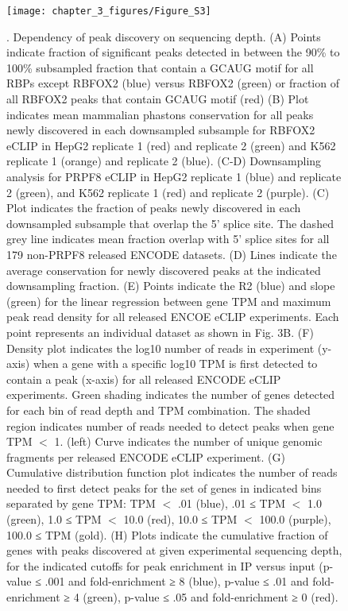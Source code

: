 \begin{figure}[ht]
  \centering
  \texttt{[image: chapter\_3\_figures/Figure\_S3]}
  \caption[Supplementary Figure 3]{. Dependency of peak discovery on sequencing depth.
    (A) Points indicate fraction of significant peaks detected in between the 90\% to 100\% subsampled fraction that contain a GCAUG motif for all RBPs except RBFOX2 (blue) versus RBFOX2 (green) or fraction of all RBFOX2 peaks that contain GCAUG motif (red) (B) Plot indicates mean mammalian phastons conservation for all peaks newly discovered in each downsampled subsample for RBFOX2 eCLIP in HepG2 replicate 1 (red) and replicate 2 (green) and K562 replicate 1 (orange) and replicate 2 (blue). (C-D) Downsampling analysis for PRPF8 eCLIP in HepG2 replicate 1 (blue) and replicate 2 (green), and K562 replicate 1 (red) and replicate 2 (purple). (C) Plot indicates the fraction of peaks newly discovered in each downsampled subsample that overlap the 5’ splice site. The dashed grey line indicates mean fraction overlap with 5’ splice sites for all 179 non-PRPF8 released ENCODE datasets. (D) Lines indicate the average conservation for newly discovered peaks at the indicated downsampling fraction. (E) Points indicate the R2 (blue) and slope (green) for the linear regression between gene TPM and maximum peak read density for all released ENCOE eCLIP experiments. Each point represents an individual dataset as shown in Fig. 3B. (F) Density plot indicates the log10 number of reads in experiment (y-axis) when a gene with a specific log10 TPM is first detected to contain a peak (x-axis) for all released ENCODE eCLIP experiments. Green shading indicates the number of genes detected for each bin of read depth and TPM combination. The shaded region indicates number of reads needed to detect peaks when gene TPM $<$ 1. (left) Curve indicates the number of unique genomic fragments per released ENCODE eCLIP experiment. (G) Cumulative distribution function plot indicates the number of reads needed to first detect peaks for the set of genes in indicated bins separated by gene TPM: TPM $<$ .01 (blue), .01 ≤ TPM $<$ 1.0 (green), 1.0 ≤ TPM $<$ 10.0 (red), 10.0 ≤ TPM $<$ 100.0 (purple), 100.0 ≤ TPM (gold). (H) Plots indicate the cumulative fraction of genes with peaks discovered at given experimental sequencing depth, for the indicated cutoffs for peak enrichment in IP versus input (p-value ≤ .001 and fold-enrichment ≥ 8 (blue), p-value ≤ .01 and fold-enrichment ≥ 4 (green), p-value ≤ .05 and fold-enrichment ≥ 0 (red).}
  \label{fig:Figure_S3}
\end{figure}

